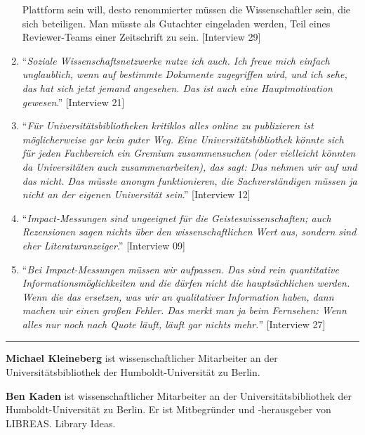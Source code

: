 \documentclass[a4paper,
fontsize=11pt,
oneside,
numbers=noperiodatend,
parskip=half-,
bibliography=totoc,
final
]{scrartcl}
\begin{document}
\begin{enumerate}
{{  Plattform sein will, desto renommierter müssen die Wissenschaftler
  sein, die sich beteiligen. Man müsste als Gutachter eingeladen werden,
  Teil eines Reviewer-Teams einer Zeitschrift zu sein}.} {[}Interview
  29{]}
\item
  \enquote{\emph{Soziale Wissenschaftsnetzwerke nutze ich auch. Ich
  freue mich einfach unglaublich, wenn auf bestimmte Dokumente
  zugegriffen wird, und ich sehe, das hat sich jetzt jemand angesehen.
  Das ist auch eine Hauptmotivation gewesen}.} {[}Interview 21{]}
\item
  \enquote{\emph{Für Universitätsbibliotheken kritiklos alles online zu
  publizieren ist möglicherweise gar kein guter Weg. Eine
  Universitätsbibliothek könnte sich für jeden Fachbereich ein Gremium
  zusammensuchen (oder vielleicht könnten da Universitäten auch
  zusammenarbeiten), das sagt: Das nehmen wir auf und das nicht. Das
  müsste anonym funktionieren, die Sachverständigen müssen ja nicht an
  der eigenen Universität sein}.} {[}Interview 12{]}
\item
  \enquote{\emph{Impact-Messungen sind ungeeignet für die
  Geisteswissenschaften; auch Rezensionen sagen nichts über den
  wissenschaftlichen Wert aus, sondern sind eher Literaturanzeiger}.}
  {[}Interview 09{]}
\item
  \enquote{\emph{Bei Impact-Messungen müssen wir aufpassen. Das sind
  rein quantitative Informationsmöglichkeiten und die dürfen nicht die
  hauptsächlichen werden. Wenn die das ersetzen, was wir an qualitativer
  Information haben, dann machen wir einen großen Fehler. Das merkt man
  ja beim Fernsehen: Wenn alles nur noch nach Quote läuft, läuft gar
  nichts mehr.}} {[}Interview 27{]}
\end{enumerate}

\begin{center}\rule{0.5\linewidth}{\linethickness}\end{center}

\textbf{Michael Kleineberg} ist wissenschaftlicher Mitarbeiter an der
Universitätsbibliothek der Hum\-boldt-Universität zu Berlin.

\textbf{Ben Kaden} ist wissenschaftlicher Mitarbeiter an der
Universitätsbibliothek der Humboldt-Uni\-versität zu Berlin. Er ist
Mitbegründer und -herausgeber von LIBREAS. Library Ideas.
\end{document}
